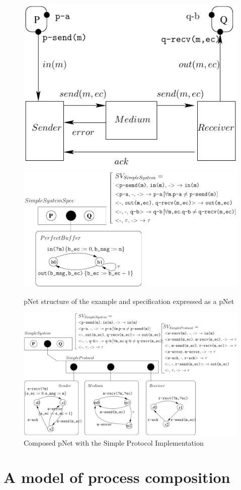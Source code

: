 \documentclass{lmcs}
\begin{document}
\begin{figure}[t]
   \includegraphics[width=.37\textwidth]{XFIG/SimpleProt-Schema}
   \includegraphics[width=.62\textwidth]{XFIG/SimpleProt2-Spec}
   \caption{pNet structure of the example and specification expressed as a pNet}
   \label{SimpleProt:Spec}

\end{figure}

  
\begin{figure}[t]
  \centerline{\includegraphics[width=.95\textwidth]{XFIG/SimpleProt2-pNet-tau}}
  \caption{Composed pNet with the Simple Protocol Implementation}  \label{SimpleProt:Impl}
\end{figure}

\section{A model of process composition}\label{sec:OT}
\end{document}
